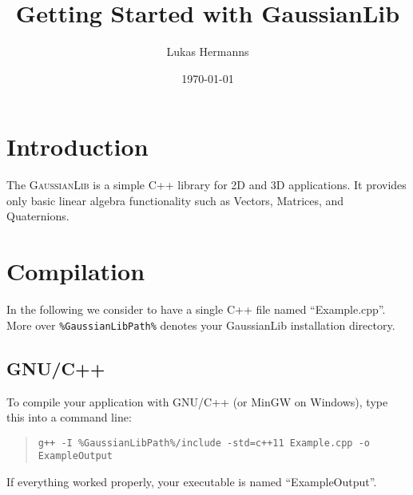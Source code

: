 \documentclass{article}
\title{Getting Started with GaussianLib}
\author{Lukas Hermanns}
\date{\today}
\begin{document}

\def\gausslib{\textsc{GaussianLib}\xspace}


\maketitle



\section*{Introduction}

The \gausslib is a simple C++ library for 2D and 3D applications.
It provides only basic linear algebra functionality such as Vectors, Matrices, and Quaternions.



\section*{Compilation}

In the following we consider to have a single C++ file named ``Example.cpp''.
More over \texttt{\%GaussianLibPath\%} denotes your GaussianLib installation directory.

\subsection*{GNU/C++}

To compile your application with GNU/C++ (or MinGW on Windows), type this into a command line:
\begin{quote}
\texttt{g++ -I \%GaussianLibPath\%/include -std=c++11 Example.cpp -o ExampleOutput}
\end{quote}
If everything worked properly, your executable is named ``ExampleOutput''.
\end{document}
